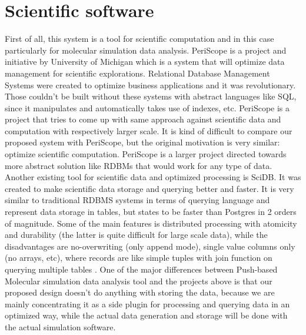 \documentclass[12pt,letterpaper]{report}
\begin{document}
\section{Scientific software}

\hspace{3em} First of all, this system is a tool for scientific computation and in this case particularly for molecular simulation data analysis. PeriScope is a project and initiative by University of Michigan which is a system that will optimize data management for scientific explorations. Relational Database Management Systems were created to optimize business applications and it was revolutionary. Those couldn't be built without these systems with abstract languages like SQL, since it manipulates and automatically takes use of indexes, etc. PeriScope is a project that tries to come up with same approach against scientific data and computation with respectively larger scale.\cite{PeriScope} It is kind of difficult to compare our proposed system with PeriScope, but the original motivation is very similar: optimize scientific computation. PeriScope is a larger project directed towards more abstract solution like RDBMs that would work for any type of data. Another existing tool for scientific data and optimized processing is SciDB. It was created to make scientific data storage and querying better and faster. It is very similar to traditional RDBMS systems in terms of querying language and represent data storage in tables, but states to be faster than Postgres in 2 orders of magnitude. Some of the main features is distributed processing with atomicity and durability (the latter is quite difficult for large scale data), while the disadvantages are no-overwriting (only append mode), single value columns only (no arrays, etc), where records are like simple tuples with join function on querying multiple tables \cite{SciDB}. One of the major differences between Push-based Molecular simulation data analysis tool and the projects above is that our proposed design doesn't do anything with storing the data, because we are mainly concentrating it as a side plugin for processing and querying data in an optimized way, while the actual data generation and storage will be done with the actual simulation software.
\end{document}
